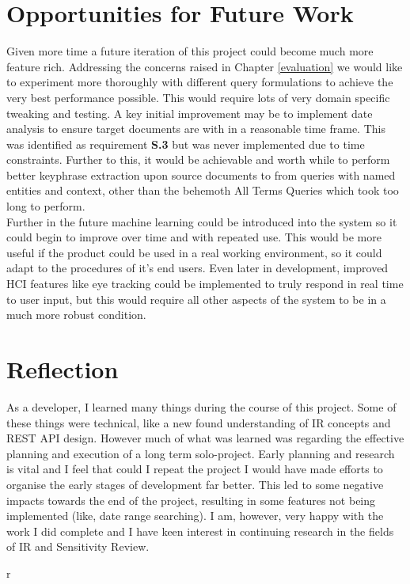 \documentclass{l4proj}
\begin{document}
\section{Opportunities for Future Work}
Given more time a future iteration of this project could become much more feature rich. Addressing the concerns raised in Chapter \ref{evaluation} we would like to experiment more thoroughly with different query formulations to achieve the very best performance possible. This would require lots of very domain specific tweaking and testing. A key initial improvement may be to implement date analysis to ensure target documents are with in a reasonable time frame. This was identified as requirement \textbf{S.3} but was never implemented due to time constraints.
Further to this, it would be achievable and worth while to perform better keyphrase extraction upon source documents to from queries with named entities and context, other than the behemoth All Terms Queries which took too long to perform. \\
Further in the future machine learning could be introduced into the system so it could begin to improve over time and with repeated use. This would be more useful if the product could be used in a real working environment, so it could adapt to the procedures of it's end users.
Even later in development, improved HCI features like eye tracking could be implemented to truly respond in real time to user input, but this would require all other aspects of the system to be in a much more robust condition.

\section{Reflection}
As a developer, I learned many things during the course of this project. Some of these things were technical, like a new found understanding of IR concepts and REST API design. However much of what was learned was regarding the effective planning and execution of a long term solo-project. Early planning and research is vital and I feel that could I repeat the project I would have made efforts to organise the early stages of development far better. This led to some negative impacts towards the end of the project, resulting in some features not being implemented (like, date range searching). I am, however, very happy with the work I did complete and I have keen interest in continuing research in the fields of IR and Sensitivity Review.

\begin{appendices}  r

\end{appendices}




\end{document}
